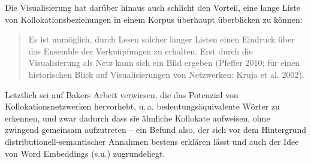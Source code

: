 Die Visualisierung hat darüber hinaus auch schlicht den Vorteil, eine lange Liste von Kollokationsbeziehungen in einem Korpus überhaupt überblicken zu können:

\begin{quote}
Es ist unmöglich, durch Lesen solcher langer Listen einen Eindruck über das Ensemble der Verknüpfungen zu erhalten. Erst durch die Visualisierung als Netz kann sich ein Bild ergeben (Pfeffer 2010; für einen historischen Blick auf Visualisierungen von Netzwerken: Kruja et al. 2002). \autocite[231]{bubenhofer9DiskurslinguistikUnd2018}
\end{quote}

Letztlich sei auf Bakers Arbeit verwiesen, die das Potenzial von Kollokationsnetzwerken hervorhebt, u.\,a. bedeutungsäquivalente Wörter zu erkennen, und zwar dadurch dass sie ähnliche Kollokate aufweisen, ohne zwingend gemeinsam aufzutreten \autocite*[147-148]{bakerShapesCollocation2016} -- ein Befund also, der sich vor dem Hintergrund distributionell-semantischer Annahmen bestens erklären lässt und auch der Idee von Word Embeddings (s.u.) zugrundeliegt.

